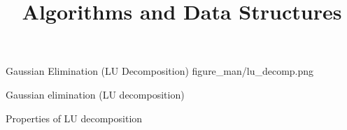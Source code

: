 \documentclass[11pt,compress,t,notes=noshow, xcolor=table]{beamer}
\title{Algorithms and Data Structures}
\begin{document}
{Gaussian Elimination (LU Decomposition)}
{figure_man/lu_decomp.png}
{
  \item Gaussian elimination (LU decomposition)
  \item Properties of LU decomposition
}

% 
% 
% 
% 
% 
% 
% 
% 
% 




\end{document}
